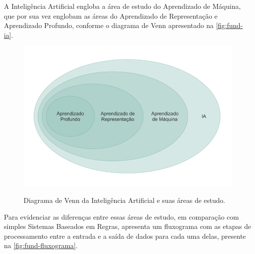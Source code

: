 A Inteligência Artificial engloba a área de estudo do Aprendizado de Máquina, que por sua vez englobam as áreas do Aprendizado de Representação e Aprendizado Profundo, conforme o diagrama de Venn apresentado na \autoref{fig:fund-ia}.

\begin{figure}[h!] %
  \centering
  \caption{Diagrama de Venn da Inteligência Artificial e suas áreas de estudo. }
  \includegraphics[scale=1.1]{img/img-fundamentacao-ia.pdf}
  \label{fig:fund-ia}
\end{figure}

Para evidenciar as diferenças entre essas áreas de estudo, em comparação com simples Sistemas Baseados em Regras,  apresenta um fluxograma com as etapas de processamento entre a entrada e a saída de dados para cada uma delas, presente na \autoref{fig:fund-fluxograma}.


